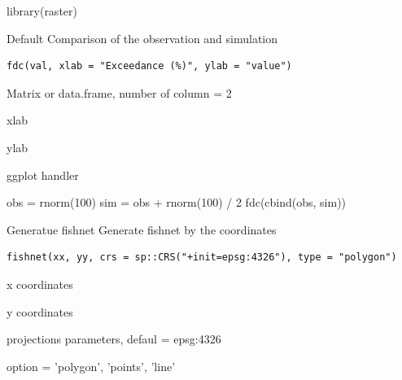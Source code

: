 \documentclass[a4paper]{book}
\begin{document}
%
\begin{Examples}
\begin{ExampleCode}
library(raster)
\end{ExampleCode}
\end{Examples}
%
\begin{Description}\relax
Default Comparison of the observation and simulation
\end{Description}
%
\begin{Usage}
\begin{verbatim}
fdc(val, xlab = "Exceedance (%)", ylab = "value")
\end{verbatim}
\end{Usage}
%
\begin{Arguments}
\begin{ldescription}
\item[\code{val}] Matrix or data.frame, number of column = 2

\item[\code{xlab}] xlab

\item[\code{ylab}] ylab
\end{ldescription}
\end{Arguments}
%
\begin{Value}
ggplot handler
\end{Value}
%
\begin{Examples}
\begin{ExampleCode}
obs = rnorm(100)
sim = obs + rnorm(100) / 2
fdc(cbind(obs, sim))
\end{ExampleCode}
\end{Examples}
%
\begin{Description}\relax
Generatue fishnet
 Generate fishnet by the coordinates
\end{Description}
%
\begin{Usage}
\begin{verbatim}
fishnet(xx, yy, crs = sp::CRS("+init=epsg:4326"), type = "polygon")
\end{verbatim}
\end{Usage}
%
\begin{Arguments}
\begin{ldescription}
\item[\code{xx}] x coordinates

\item[\code{yy}] y coordinates

\item[\code{crs}] projections parameters, defaul = epsg:4326

\item[\code{type}] option = 'polygon', 'points', 'line'
\end{ldescription}
\end{Arguments}
\end{document}
